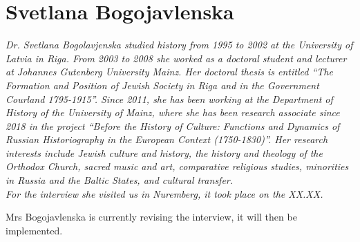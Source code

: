 \section{Svetlana Bogojavlenska}

\textit{Dr. Svetlana Bogolavjenska studied history from 1995 to 2002 at the University of Latvia in Riga. From 2003 to 2008 she worked as a doctoral student and lecturer at Johannes Gutenberg University Mainz. Her doctoral thesis is entitled "`The Formation and Position of Jewish Society in Riga and in the Government Courland 1795-1915"'. Since 2011, she has been working at the Department of History of the University of Mainz, where she has been research associate since 2018 in the project "`Before the History of Culture: Functions and Dynamics of Russian Historiography in the European Context (1750-1830)"'. Her research interests include Jewish culture and history, the history and theology of the Orthodox Church, sacred music and art, comparative religious studies, minorities in Russia and the Baltic States, and cultural transfer.\\
For the interview she visited us in Nuremberg, it took place on the XX.XX.}\par
\vspace*{2em}
Mrs Bogojavlenska is currently revising the interview, it will then be implemented.